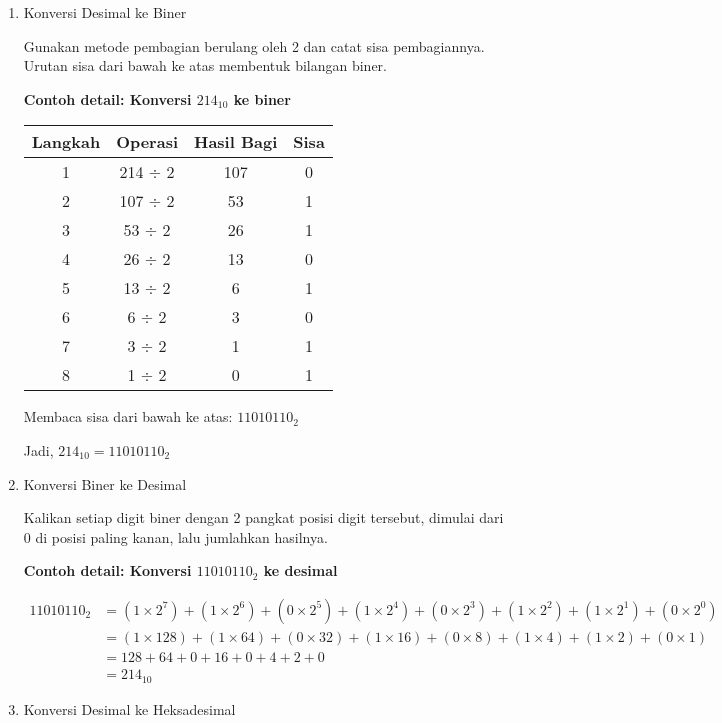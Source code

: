\documentclass[../main.tex]{subfiles}
\begin{document}
\begin{enumerate}
\item{Konversi Desimal ke Biner}

Gunakan metode pembagian berulang oleh 2 dan catat sisa pembagiannya. Urutan sisa dari bawah ke atas membentuk bilangan biner.

\textbf{Contoh detail: Konversi \(214_{10}\) ke biner}

\begin{center}
\begin{tabular}{|c|c|c|c|}
\hline
\textbf{Langkah} & \textbf{Operasi} & \textbf{Hasil Bagi} & \textbf{Sisa} \\
\hline
1 & 214 $\div$ 2 & 107 & 0 \\
2 & 107 $\div$ 2 & 53 & 1 \\
3 & 53 $\div$ 2 & 26 & 1 \\
4 & 26 $\div$ 2 & 13 & 0 \\
5 & 13 $\div$ 2 & 6 & 1 \\
6 & 6 $\div$ 2 & 3 & 0 \\
7 & 3 $\div$ 2 & 1 & 1 \\
8 & 1 $\div$ 2 & 0 & 1 \\
\hline
\end{tabular}
\end{center}

Membaca sisa dari bawah ke atas: \(11010110_2\)

Jadi, \(214_{10} = 11010110_2\)

\item{Konversi Biner ke Desimal}

Kalikan setiap digit biner dengan 2 pangkat posisi digit tersebut, dimulai dari 0 di posisi paling kanan, lalu jumlahkan hasilnya.

\textbf{Contoh detail: Konversi \(11010110_2\) ke desimal}

\begin{align*}
11010110_2 &= (1 \times 2^7) + (1 \times 2^6) + (0 \times 2^5) + (1 \times 2^4) + (0 \times 2^3) + (1 \times 2^2) + (1 \times 2^1) + (0 \times 2^0) \\
&= (1 \times 128) + (1 \times 64) + (0 \times 32) + (1 \times 16) + (0 \times 8) + (1 \times 4) + (1 \times 2) + (0 \times 1) \\
&= 128 + 64 + 0 + 16 + 0 + 4 + 2 + 0 \\
&= 214_{10}
\end{align*}

\item{Konversi Desimal ke Heksadesimal}


\end{enumerate}
\end{document}
